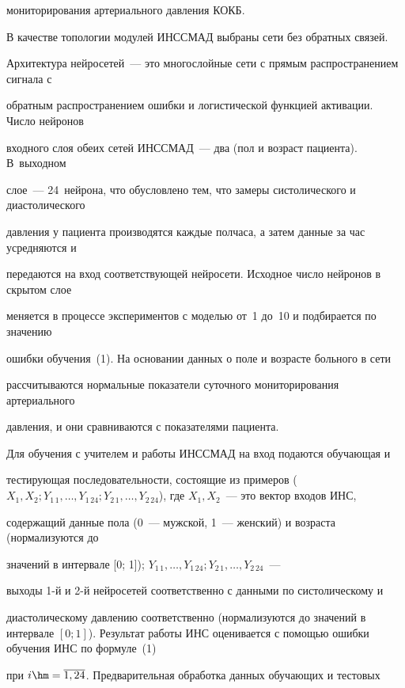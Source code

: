 мониторирования артериального давления КОКБ.





 В качестве топологии модулей ИНССМАД выбраны сети без обратных связей.


Архитектура нейросетей~--- это многослойные сети с прямым распространением сигнала с


обратным распространением ошибки и логистической функцией активации. Число нейронов


входного слоя обеих сетей ИНССМАД~--- два (пол и возраст пациента). В~выходном


 слое~--- 24~нейрона, что обусловлено тем, что замеры систолического и диастолического


давления у пациента производятся каждые полчаса, а затем данные за час усредняются и


передаются на вход соответствующей нейросети. Исходное число нейронов в скрытом слое


меняется в процессе экспериментов с моделью от~1 до~10 и подбирается по значению


ошибки обучения~(1). На основании данных о поле и возрасте больного в сети


рассчитываются нормальные показатели суточного мониторирования артериального


давления, и они сравниваются с показателями пациента.





 Для обучения с учителем и работы ИНССМАД на вход подаются обучающая и


тестирующая последовательности, состоящие из примеров ($X_1, X_2; Y_{1\,1},\ldots


,Y_{1\,24}; Y_{2\,1},\ldots , Y_{2\,24}$), где $X_1,X_2$~--- это вектор входов ИНС,


содержащий данные пола (0~--- мужской, 1~--- женский) и возраста (нормализуются до


значений в интервале [0; 1]); $Y_{1\,1},\ldots , Y_{1\,24}; Y_{2\,1},\ldots , Y_{2\,24}$~---


выходы 1-й и 2-й нейросетей соответственно с данными по систолическому и


диастолическому давлению соответственно (нормализуются до значений в интервале $[0;


1]$). Результат работы ИНС оценивается с помощью ошибки обучения ИНС по формуле~(1)


при $i\hm=\overline{1,24}$. Предварительная обработка данных обучающих и тестовых


